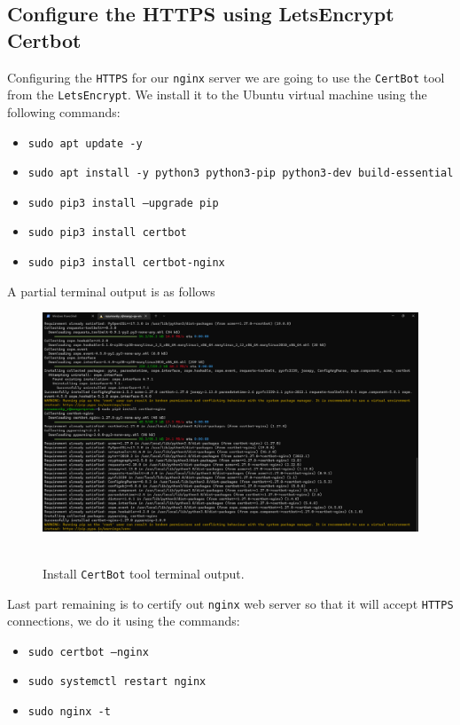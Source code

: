 \subsection{Configure the HTTPS using LetsEncrypt Certbot}\label{subsec:configure-https-using-letsencrypt-certbot}
Configuring the \texttt{HTTPS} for our \texttt{nginx} server we are going to use the \texttt{CertBot} tool
from the \texttt{LetsEncrypt}.
We install it to the Ubuntu virtual machine using the following commands:
\begin{itemize}
    \item \texttt{sudo apt update -y}
    \item \texttt{sudo apt install -y python3 python3-pip python3-dev build-essential}
    \item \texttt{sudo pip3 install --upgrade pip}
    \item \texttt{sudo pip3 install certbot}
    \item \texttt{sudo pip3 install certbot-nginx}
\end{itemize}
A partial terminal output is as follows
\begin{figure}[H]
    \centering
    \includegraphics[width=1\textwidth]{img/07_install_certbot_console_output}
    ~\caption{Install \texttt{CertBot} tool terminal output.}\label{fig:figure21}
\end{figure}
Last part remaining is to certify out \texttt{nginx} web server so that it will accept \texttt{HTTPS} connections,
we do it using the commands:
\begin{itemize}
    \item \texttt{sudo certbot --nginx}
    \item \texttt{sudo systemctl restart nginx}
    \item \texttt{sudo nginx -t}
\end{itemize}

